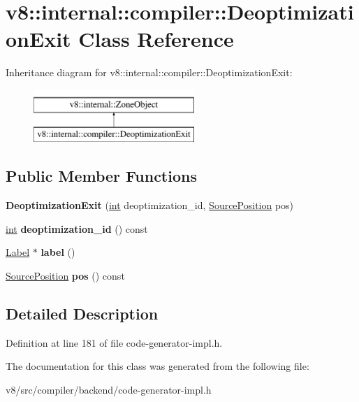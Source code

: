 \hypertarget{classv8_1_1internal_1_1compiler_1_1DeoptimizationExit}{}\section{v8\+:\+:internal\+:\+:compiler\+:\+:Deoptimization\+Exit Class Reference}
\label{classv8_1_1internal_1_1compiler_1_1DeoptimizationExit}
Inheritance diagram for v8\+:\+:internal\+:\+:compiler\+:\+:Deoptimization\+Exit\+:\begin{figure}[H]
\begin{center}
\leavevmode
\includegraphics[height=2.000000cm]{classv8_1_1internal_1_1compiler_1_1DeoptimizationExit}
\end{center}
\end{figure}
\subsection*{Public Member Functions}
\begin{DoxyCompactItemize}
\item 
\mbox{\label{classv8_1_1internal_1_1compiler_1_1DeoptimizationExit_a062c370799bf85cb23767ddf479bc3e1}} 
{\bfseries Deoptimization\+Exit} (\mbox{\hyperlink{classint}{int}} deoptimization\+\_\+id, \mbox{\hyperlink{classv8_1_1internal_1_1SourcePosition}{Source\+Position}} pos)
\item 
\mbox{\label{classv8_1_1internal_1_1compiler_1_1DeoptimizationExit_a528f1b21a1e73fb68dc2506b343c406e}} 
\mbox{\hyperlink{classint}{int}} {\bfseries deoptimization\+\_\+id} () const
\item 
\mbox{\label{classv8_1_1internal_1_1compiler_1_1DeoptimizationExit_aacbab8bdac36acc53466bf51a48a1845}} 
\mbox{\hyperlink{classv8_1_1internal_1_1Label}{Label}} $\ast$ {\bfseries label} ()
\item 
\mbox{\label{classv8_1_1internal_1_1compiler_1_1DeoptimizationExit_a5fcad6c955855fac888edff6311430a3}} 
\mbox{\hyperlink{classv8_1_1internal_1_1SourcePosition}{Source\+Position}} {\bfseries pos} () const
\end{DoxyCompactItemize}


\subsection{Detailed Description}


Definition at line 181 of file code-\/generator-\/impl.\+h.



The documentation for this class was generated from the following file\+:\begin{DoxyCompactItemize}
\item 
v8/src/compiler/backend/code-\/generator-\/impl.\+h\end{DoxyCompactItemize}
